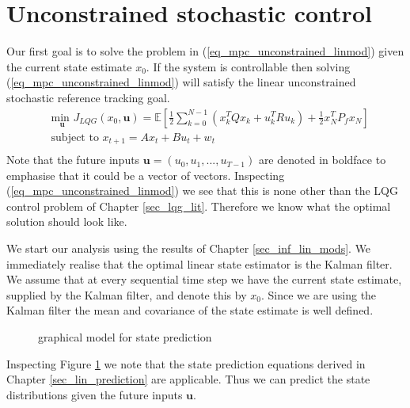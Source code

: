 \section{Unconstrained stochastic control}
\label{sec_uncon_lin_control}
Our first goal is to solve the problem in (\ref{eq_mpc_unconstrained_linmod}) given the current state estimate $x_0$. If the system is controllable then solving (\ref{eq_mpc_unconstrained_linmod}) will satisfy the linear unconstrained stochastic reference tracking goal.
\begin{equation}
\begin{aligned}
&\underset{\mathbf{u}}{\text{min }} J_{LQG}(x_0, \mathbf{u}) = \mathbb{E}\left[ \frac{1}{2}\sum_{k=0}^{N-1} \left( x_k^TQx_k + u_k^TRu_k \right) + \frac{1}{2}x_N^TP_fx_N \right] \\
& \text{subject to } x_{t+1}=Ax_t+Bu_t + w_t\\
\end{aligned}
\label{eq_mpc_unconstrained_linmod}
\end{equation}
Note that the future inputs $\mathbf{u}=(u_0, u_1,...,u_{T-1})$ are denoted in boldface to emphasise that it could be a vector of vectors. Inspecting (\ref{eq_mpc_unconstrained_linmod}) we see that this is none other than the LQG control problem of Chapter \ref{sec_lqg_lit}. Therefore we know what the optimal solution should look like.

We start our analysis using the results of Chapter \ref{sec_inf_lin_mods}. We immediately realise that the optimal linear state estimator is the Kalman filter. We assume that at every sequential time step we have the current state estimate, supplied by the Kalman filter, and denote this by $x_0$. Since we are using the Kalman filter the mean and covariance of the state estimate is well defined. 
\begin{figure}[H] 
\centering
{}
\caption{graphical model for state prediction}
\label{fig_gm_mpc}
\end{figure}
Inspecting Figure \ref{fig_gm_mpc} we note that the state prediction equations derived in Chapter \ref{sec_lin_prediction} are applicable. Thus we can predict the state distributions given the future inputs $\mathbf{u}$.

